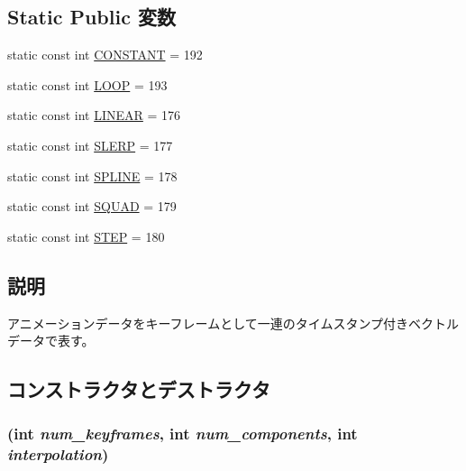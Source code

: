 \subsection*{Static Public 変数}
\begin{CompactItemize}
\item 
static const int \hyperlink{classm3g_1_1KeyframeSequence_b45ff833865ae8962be27923995f91a3}{CONSTANT} = 192
\item 
static const int \hyperlink{classm3g_1_1KeyframeSequence_ecc439231d4f3639e6f6a9625615a0f7}{LOOP} = 193
\item 
static const int \hyperlink{classm3g_1_1KeyframeSequence_23ccf193c67257f1be26417041cecb31}{LINEAR} = 176
\item 
static const int \hyperlink{classm3g_1_1KeyframeSequence_77ebb943765f530d2883e1c26127d3ce}{SLERP} = 177
\item 
static const int \hyperlink{classm3g_1_1KeyframeSequence_fbb002ac924c1349dead17c16b6fa720}{SPLINE} = 178
\item 
static const int \hyperlink{classm3g_1_1KeyframeSequence_0ad85e76e101b5eabf5a5c5f48648845}{SQUAD} = 179
\item 
static const int \hyperlink{classm3g_1_1KeyframeSequence_07dc1c0bf7f480095150d1b1c34c8218}{STEP} = 180
\end{CompactItemize}


\subsection{説明}
アニメーションデータをキーフレームとして一連のタイムスタンプ付きベクトルデータで表す。 

\subsection{コンストラクタとデストラクタ}
\hypertarget{classm3g_1_1KeyframeSequence_f48cc8113ad7300d72840b18529aaf0e}{
\subsubsection[{KeyframeSequence}]{ (int {\em num\_\-keyframes}, \/  int {\em num\_\-components}, \/  int {\em interpolation})}}
\label{classm3g_1_1KeyframeSequence_f48cc8113ad7300d72840b18529aaf0e}


